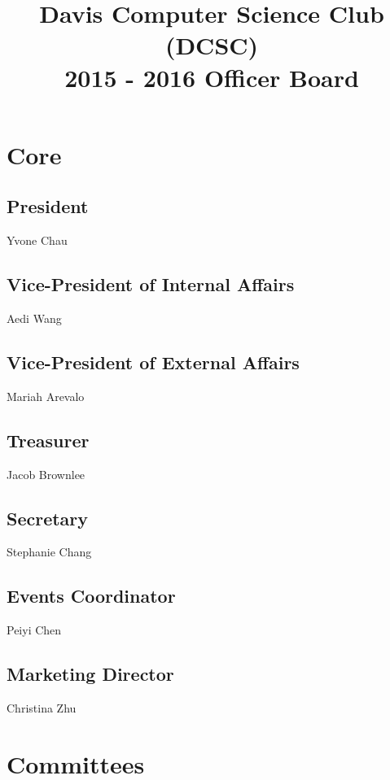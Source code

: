 \documentclass[10pt]{article}
\title{Davis Computer Science Club (DCSC)\\2015 - 2016 Officer Board}
\date{}
\author{}
\begin{document}
\maketitle

\section{Core}

\subsection{President}

Yvone Chau

\subsection{Vice-President of Internal Affairs}

Aedi Wang

\subsection{Vice-President of External Affairs}

Mariah Arevalo

\subsection{Treasurer}

Jacob Brownlee

\subsection{Secretary}

Stephanie Chang

\subsection{Events Coordinator}

Peiyi Chen

\subsection{Marketing Director}

Christina Zhu

\section{Committees}
\end{document}
